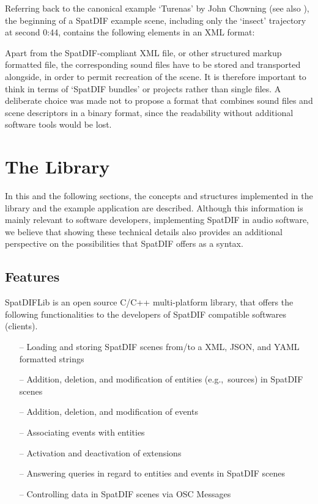 \documentclass[a4paper]{article}
\begin{document}
Referring back to the canonical example `Turenas' by John Chowning (see also \cite{Peters:2013SpatDifCMJ}), the beginning of a SpatDIF example scene, including only the `insect' trajectory at second 0:44, contains the following elements in an XML format:

 

Apart from the SpatDIF-compliant XML file, or other structured markup formatted file, the corresponding sound files have to be stored and transported alongside, in order to permit recreation of the scene.
It is therefore important to think in terms of `SpatDIF bundles' or projects rather than single files.
A deliberate choice was made not to propose a format that combines sound files and scene descriptors in a binary format, since the readability without additional software tools would be lost.

\section{The Library} %

In this and the following sections, the concepts and structures implemented in the library and the example application are described.
Although this information is mainly relevant to software developers, implementing SpatDIF in audio software, we believe that showing these technical details also provides an additional perspective on the possibilities that SpatDIF offers as a syntax.

\subsection{Features}
SpatDIFLib is an open source C/C++ multi-platform library, that offers the following functionalities to the developers of SpatDIF compatible softwares (clients).

\begin{itemize}[leftmargin=*]
\item[--] Loading and storing SpatDIF scenes from/to a XML, JSON, and YAML formatted strings
\item[--] Addition, deletion, and modification of entities (e.g.,~sources) in SpatDIF scenes 
\item[--] Addition, deletion, and modification of events
\item[--] Associating events with entities
\item[--] Activation and deactivation of extensions
\item[--] Answering queries in regard to entities and events in SpatDIF scenes
\item[--] Controlling data in SpatDIF scenes via OSC Messages
\end{itemize}
\end{document}
